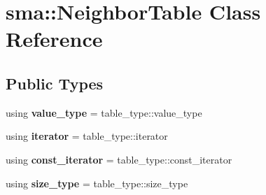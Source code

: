 \hypertarget{classsma_1_1NeighborTable}{\section{sma\-:\-:Neighbor\-Table Class Reference}
\label{classsma_1_1NeighborTable}
}
\subsection*{Public Types}
\begin{DoxyCompactItemize}
\item 
\hypertarget{classsma_1_1NeighborTable_ace1f1d7df173e5c91265bc954b624c4f}{using {\bfseries value\-\_\-type} = table\-\_\-type\-::value\-\_\-type}\label{classsma_1_1NeighborTable_ace1f1d7df173e5c91265bc954b624c4f}

\item 
\hypertarget{classsma_1_1NeighborTable_aff8b8fb7623aeb232c7a7b567fe5e51e}{using {\bfseries iterator} = table\-\_\-type\-::iterator}\label{classsma_1_1NeighborTable_aff8b8fb7623aeb232c7a7b567fe5e51e}

\item 
\hypertarget{classsma_1_1NeighborTable_ac596e231fc7a1202882853d4b8c1f93a}{using {\bfseries const\-\_\-iterator} = table\-\_\-type\-::const\-\_\-iterator}\label{classsma_1_1NeighborTable_ac596e231fc7a1202882853d4b8c1f93a}

\item 
\hypertarget{classsma_1_1NeighborTable_ace2540e6f895d104730ac7c1e79178d8}{using {\bfseries size\-\_\-type} = table\-\_\-type\-::size\-\_\-type}\label{classsma_1_1NeighborTable_ace2540e6f895d104730ac7c1e79178d8}

\end{DoxyCompactItemize}
